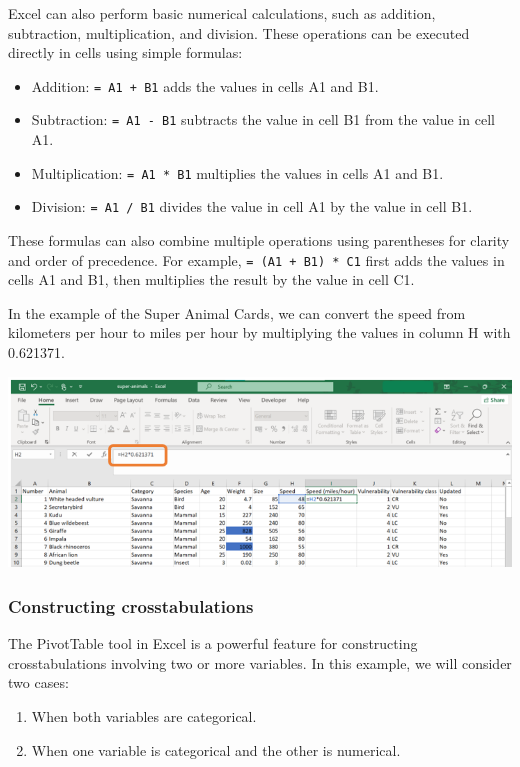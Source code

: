 \documentclass[
]{book}
\begin{document}
Excel can also perform basic numerical calculations, such as addition, subtraction, multiplication, and division. These operations can be executed directly in cells using simple formulas:

\begin{itemize}
\item
  Addition: \texttt{=\ A1\ +\ B1} adds the values in cells A1 and B1.
\item
  Subtraction: \texttt{=\ A1\ -\ B1} subtracts the value in cell B1 from the value in cell A1.
\item
  Multiplication: \texttt{=\ A1\ *\ B1} multiplies the values in cells A1 and B1.
\item
  Division: \texttt{=\ A1\ /\ B1} divides the value in cell A1 by the value in cell B1.
\end{itemize}

These formulas can also combine multiple operations using parentheses for clarity and order of precedence. For example, \texttt{=\ (A1\ +\ B1)\ *\ C1} first adds the values in cells A1 and B1, then multiplies the result by the value in cell C1.

In the example of the Super Animal Cards, we can convert the speed from kilometers per hour to miles per hour by multiplying the values in column H with 0.621371.

\begin{center}\includegraphics[width=0.7\linewidth]{Figures/manipulation_3_1} \end{center}

\subsubsection*{Constructing crosstabulations}\label{constructing-crosstabulations}

The PivotTable tool in Excel is a powerful feature for constructing crosstabulations involving two or more variables. In this example, we will consider two cases:

\begin{enumerate}
\def\labelenumi{\arabic{enumi}.}
\item
  When both variables are categorical.
\item
  When one variable is categorical and the other is numerical.
\end{enumerate}
\end{document}
